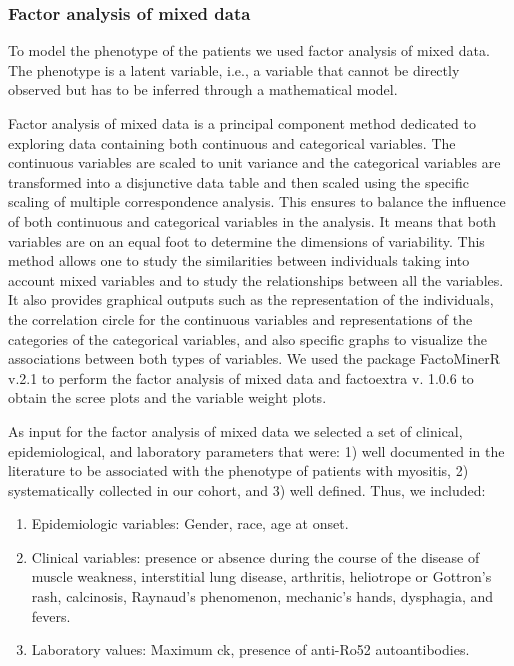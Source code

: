 \subsubsection{Factor analysis of mixed data}
To model the phenotype of the patients we used factor analysis of mixed data. The phenotype is a latent variable, i.e., a variable that cannot be directly observed but has to be inferred through a mathematical model.

Factor analysis of mixed data is a principal component method dedicated to exploring data containing both continuous and categorical variables. The continuous variables are scaled to unit variance and the categorical variables are transformed into a disjunctive data table and then scaled using the specific scaling of multiple correspondence analysis. This ensures to balance the influence of both continuous and categorical variables in the analysis. It means that both variables are on an equal foot to determine the dimensions of variability. This method allows one to study the similarities between individuals taking into account mixed variables and to study the relationships between all the variables. It also provides graphical outputs such as the representation of the individuals, the correlation circle for the continuous variables and representations of the categories of the categorical variables, and also specific graphs to visualize the associations between both types of variables.
We used the package FactoMinerR v.2.1 to perform the factor analysis of mixed data and factoextra v. 1.0.6 to obtain the scree plots and the variable weight plots.

As input for the factor analysis of mixed data we selected a set of clinical, epidemiological, and laboratory parameters that were: 1) well documented in the literature to be associated with the phenotype of patients with myositis, 2) systematically collected in our cohort, and 3) well defined. Thus, we included:

\begin{enumerate}
	\item Epidemiologic variables: Gender, race, age at onset.
	
	\item Clinical variables: presence or absence during the course of the disease of muscle weakness, interstitial lung disease, arthritis, heliotrope or Gottron’s rash, calcinosis, Raynaud’s phenomenon, mechanic’s hands, dysphagia, and fevers.
	
	\item Laboratory values: Maximum \gls{ck}, presence of anti-Ro52 autoantibodies.
\end{enumerate}

